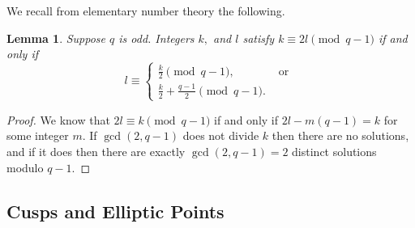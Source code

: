 \documentclass[11pt]{amsart}
\newtheorem{lemma}[theorem]{Lemma}
\theoremstyle{definition}
\numberwithin{equation}{section}
\begin{document}
		We recall from elementary number theory the following.
		\begin{lemma}
		\label{l: elementary number theory}
			Suppose $q$ is odd. Integers $k,$ and $l$ satisfy $k\equiv 2l\pmod{q-1}$ if and only if \[l\equiv \begin{cases}\frac{k}{2}\pmod{q-1}, &\text{ or }\\ \frac{k}{2}+\frac{q-1}{2}\pmod{q-1}.\end{cases}\] 
		\end{lemma}
		\begin{proof}
			We know that $2l\equiv k\pmod{q-1}$ if and only if $2l-m(q-1)=k$ for some integer $m.$ If $\gcd(2,q-1)$ does not divide $k$ then there are no solutions, and if it does then there are exactly $\gcd(2,q-1)=2$ distinct solutions modulo $q-1.$ %
		\end{proof}
		
		
		\subsection{Cusps and Elliptic Points}
		
\end{document}
